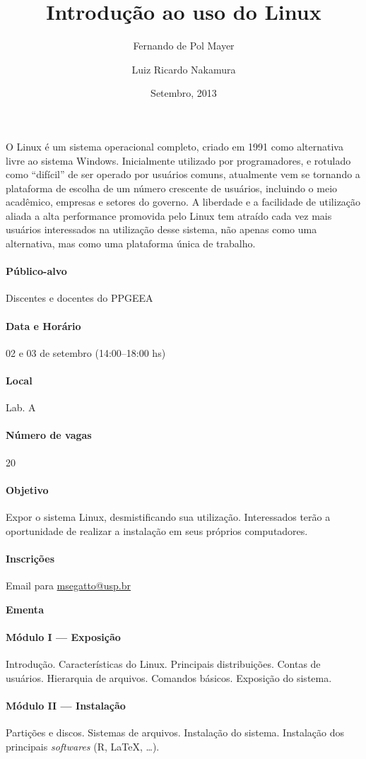 \documentclass[a4paper,12pt]{article}
\title{Introdução ao uso do Linux}
\author{Fernando de Pol Mayer \and Luiz Ricardo Nakamura}
\date{Setembro, 2013}
\providecommand{\R}{\textsf{R}\xspace}
\begin{document}
\maketitle
\thispagestyle{empty}

O Linux é um sistema operacional completo, criado em 1991 como
alternativa livre ao sistema Windows. Inicialmente utilizado por
programadores, e rotulado como ``difícil'' de ser operado por usuários
comuns, atualmente vem se tornando a plataforma de escolha de um número
crescente de usuários, incluindo o meio acadêmico, empresas e setores do
governo. A liberdade e a facilidade de utilização aliada a alta
performance promovida pelo Linux tem atraído cada vez mais usuários
interessados na utilização desse sistema, não apenas como uma
alternativa, mas como uma plataforma única de trabalho.

\paragraph{Público-alvo} Discentes e docentes do PPGEEA

\paragraph{Data e Horário} 02 e 03 de setembro (14:00--18:00 hs)

\paragraph{Local} Lab. A

\paragraph{Número de vagas} 20

\paragraph{Objetivo} Expor o sistema Linux, desmistificando sua
utilização. Interessados terão a oportunidade de realizar a instalação
em seus próprios computadores.

\paragraph{Inscrições} Email para \url{msegatto@usp.br}

\begin{center}
  \textbf{Ementa}
\end{center}

\paragraph{Módulo I --- Exposição} Introdução. Características do
Linux. Principais distribuições. Contas de usuários. Hierarquia de
arquivos. Comandos básicos. Exposição do sistema.

\paragraph{Módulo II --- Instalação} Partições e discos. Sistemas de
arquivos. Instalação do sistema. Instalação dos principais
\textit{softwares} (\R, \LaTeX, \ldots).
\end{document}
